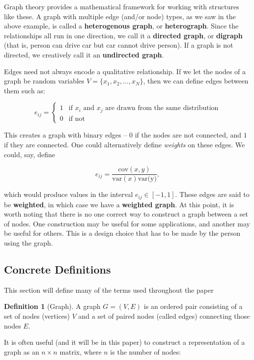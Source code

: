 \documentclass[12pt]{article}
\theoremstyle{definition}
\newtheorem{definition}{Definition}[section]
\begin{document}
Graph theory provides a mathematical framework for working with structures like these. A graph with multiple edge (and/or node) types, as we saw in the above example, is called a \textbf{heterogenous graph}, or \textbf{heterograph}. Since the relationships all run in one direction, we call it a \textbf{directed graph}, or \textbf{digraph} (that is, person can drive car but car cannot drive person). If a graph is not directed, we creatively call it an \textbf{undirected graph}.

Edges need not always encode a qualitative relationship. If we let the nodes of a graph be random variables $V = \{x_1, x_2, ..., x_N\}$, then we can define edges between them such as:

\[
e_{ij} = \begin{cases}
1 & \text{if }x_i \text{ and } x_j \text{ are drawn from the same distribution} \\ 
0 & \text{if not}
\end{cases}
\]

This creates a graph with binary edges -- $0$ if the nodes are not connected, and $1$ if they are connected. One could alternatively define \textit{weights} on these edges. We could, say, define

\[
e_{ij} = \frac{\text{cov}(x,y)}{\text{var}(x) \text{var(y)}},
\]

which would produce values in the interval $e_{ij} \in [-1, 1]$. These edges are said to be \textbf{weighted}, in which case we have a \textbf{weighted graph}. At this point, it is worth noting that there is no one correct way to construct a graph between a set of nodes. One construction may be useful for some applications, and another may be useful for others. This is a design choice that has to be made by the person using the graph.

\subsection{Concrete Definitions}
\label{sec:definitions}

This section will define many of the terms used throughout the paper

\begin{definition}[Graph]
A graph $G = (V, E)$ is an ordered pair consisting of a set of nodes (vertices) $V$ and a set of paired nodes (called edges) connecting those nodes $E$.
\end{definition}

It is often useful (and it will be in this paper) to construct a representation of a graph as an $n \times n$ matrix, where $n$ is the number of nodes:
\end{document}
